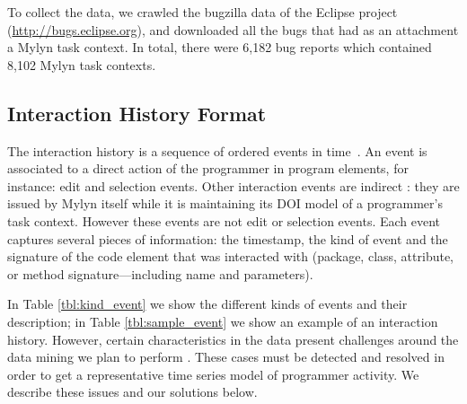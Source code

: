 \documentclass[times]{smrauth}
\begin{document}
To collect the data, we crawled the bugzilla data of the Eclipse project (\url{http://bugs.eclipse.org}), and downloaded all the bugs that had as an attachment a Mylyn task context.  In total, there were 6,182 bug reports which contained 8,102 Mylyn task contexts.



\subsection{Interaction History Format}
The interaction history is a sequence of ordered events in time~\cite{YR11}.  An event is associated to a direct action of the programmer in program elements, for instance: edit and selection events. Other interaction events are indirect \cite{KM06}: they are issued by Mylyn itself while it is maintaining its DOI model of a programmer's task context. However these events are not edit or selection events. Each event captures several pieces of information: the timestamp, the kind of event and the signature of the code element that was interacted with (package, class, attribute, or method signature---including name and parameters). 

In Table \ref{tbl:kind_event} we show the different kinds of events and their description; in Table \ref{tbl:sample_event} we show an example of an interaction history. However, certain characteristics in the data present challenges around the data mining we plan to perform \cite{MFR14}. These cases must be detected and resolved in order to get a representative time series model of programmer activity. We describe these issues and our solutions below.
\end{document}
